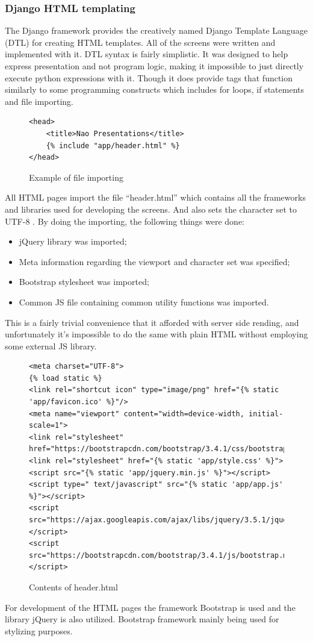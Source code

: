 \documentclass[12pt, fleqn, a4paper]{article}
\begin{document}
\subsubsection{Django HTML templating}
The Django framework provides the creatively named Django Template Language (DTL) for creating HTML templates. All of the screens were written and implemented with it. DTL syntax is fairly simplistic. It was designed to help express presentation and not program logic, making it impossible to just directly execute python expressions with it. Though it does provide tags that function similarly to some programming constructs \citep{djangoDev} which includes for loops, if statements and file importing.
\begin{figure}[H]
	\centering
	\begin{verbatim} 
<head>
    <title>Nao Presentations</title>
    {% include "app/header.html" %}
</head>
	\end{verbatim}
	\caption{Example of file importing}
\end{figure}
All HTML pages import the file \enquote{header.html} which contains all the frameworks and libraries used for developing the screens. And also sets the character set to UTF-8 \citep{htmlmanual}. By doing the importing, the following things were done:
\begin{itemize}
	\item jQuery library was imported;
	\item Meta information regarding the viewport and character set was specified;
	\item Bootstrap stylesheet was imported;
	\item Common JS file containing common utility functions was imported.
\end{itemize}
This is a fairly trivial convenience that it afforded with server side rending, and unfortunately it's impossible to do the same with plain HTML without employing some external JS library.
\begin{figure}[H]
	\centering
	\begin{verbatim} 
<meta charset="UTF-8">
{% load static %}
<link rel="shortcut icon" type="image/png" href="{% static 'app/favicon.ico' %}"/>
<meta name="viewport" content="width=device-width, initial-scale=1">
<link rel="stylesheet" href="https://bootstrapcdn.com/bootstrap/3.4.1/css/bootstrap.min.css">
<link rel="stylesheet" href="{% static 'app/style.css' %}">
<script src="{% static 'app/jquery.min.js' %}"></script>
<script type=" text/javascript" src="{% static 'app/app.js' %}"></script>
<script src="https://ajax.googleapis.com/ajax/libs/jquery/3.5.1/jquery.min.js"> </script>
<script src="https://bootstrapcdn.com/bootstrap/3.4.1/js/bootstrap.min.js"> </script>
	\end{verbatim}
	\caption{Contents of header.html}
\end{figure}
For development of the HTML pages the framework Bootstrap is used and the library jQuery is also utilized. Bootstrap framework mainly being used for stylizing purposes.
\end{document}
